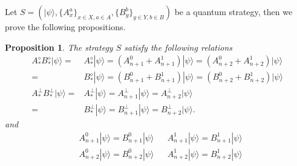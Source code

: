 \documentclass[11pt,letterpaper]{article}
\newcommand{\ket}[1]{|#1\rangle}
\newcommand{\bra}[1]{\langle#1|}
\newcommand{\ketbra}[2]{|#1\rangle\langle#2|}
\newcommand{\1}{\mathbb{1}}
\newtheorem{proposition}[theorem]{Proposition}
\theoremstyle{definition}
\begin{document}
Let $S = (\ket{\psi}, \{A_x^a\}_{x \in X, a\in A}, \{B_y^b\}_{y \in Y, b\in B})$ be a quantum strategy, then
we prove the following propositions.
\begin{proposition}
The strategy $S$ satisfy the following relations
\begin{align}
	  A_\ast^\diamond B_\ast^\diamond \ket{\psi}
	  =&A_\ast^\diamond \ket{\psi} = (A_{n+1}^0+A_{n+1}^1)\ket{\psi} = (A_{n+2}^0+A_{n+2}^1)\ket{\psi} \\
	  =&B_\ast^\diamond \ket{\psi} = (B_{n+1}^0+B_{n+1}^1)\ket{\psi} = (B_{n+2}^0+B_{n+2}^1)\ket{\psi}\\
	A_\ast^\perp B_\ast^\perp\ket{\psi}= &A_\ast^\perp\ket{\psi} = A_{n+1}^\perp \ket{\psi} = A_{n+2}^\perp \ket{\psi}\\
	=&B_\ast^\perp\ket{\psi} = B_{n+1}^\perp \ket{\psi} = B_{n+2}^\perp \ket{\psi}.
\end{align}
and
\begin{align}
&A_{n+1}^0 \ket{\psi} = B_{n+1}^0 \ket{\psi} && A_{n+1}^1\ket{\psi} = B_{n+1}^1 \ket{\psi}\\
&A_{n+2}^0 \ket{\psi} = B_{n+2}^0 \ket{\psi} && A_{n+2}^1\ket{\psi} = B_{n+2}^1 \ket{\psi}
\end{align}
\end{proposition}
\end{document}
